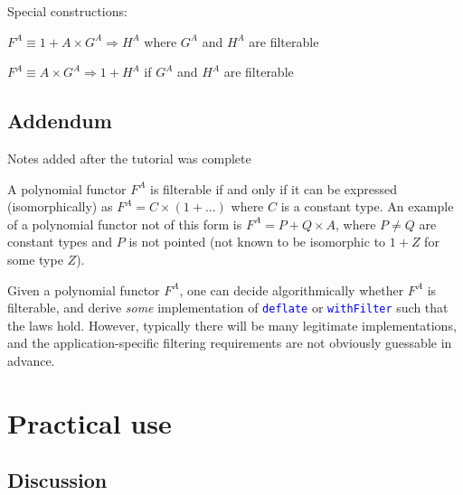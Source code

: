 Special constructions:

$F^{A}\equiv1+A\times G^{A}\Rightarrow H^{A}$ where $G^{A}$ and
$H^{A}$ are filterable

$F^{A}\equiv A\times G^{A}\Rightarrow1+H^{A}$ if $G^{A}$ and $H^{A}$
are filterable


\subsection{Addendum}

Notes added after the tutorial was complete

A polynomial functor $F^{A}$ is filterable if and only if it can
be expressed (isomorphically) as $F^{A}=C\times\left(1+...\right)$
where $C$ is a constant type. An example of a polynomial functor
not of this form is $F^{A}=P+Q\times A$, where $P\neq Q$ are constant
types and $P$ is not pointed (not known to be isomorphic to $1+Z$
for some type $Z$).

Given a polynomial functor $F^{A}$, one can decide algorithmically
whether $F^{A}$ is filterable, and derive \emph{some} implementation
of \texttt{\textcolor{blue}{\footnotesize{}deflate}} or \texttt{\textcolor{blue}{\footnotesize{}withFilter}}
such that the laws hold. However, typically there will be many legitimate
implementations, and the application-specific filtering requirements
are not obviously guessable in advance.

\section{Practical use}

\subsection{Discussion}

